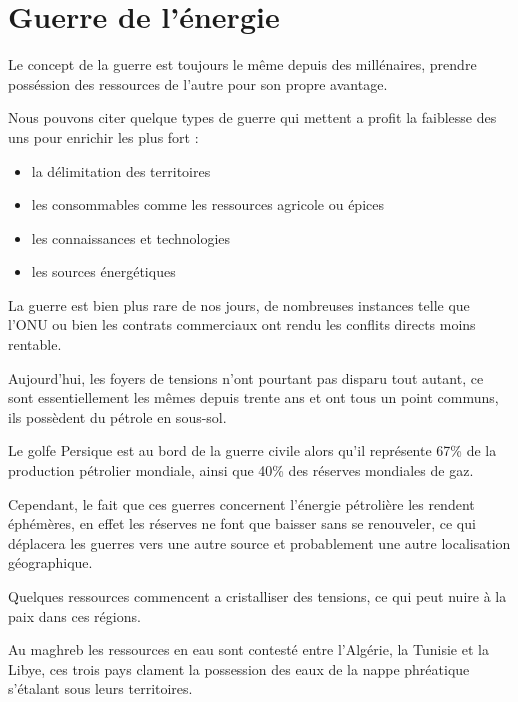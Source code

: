 \section{Guerre de l'énergie}

Le concept de la guerre est toujours le même depuis des millénaires, prendre posséssion des
ressources de l'autre pour son propre avantage.

Nous pouvons citer quelque types de guerre qui mettent a profit la faiblesse des uns
pour enrichir les plus fort :

\begin{itemize}
  \item la délimitation des territoires %
  \item les consommables comme les ressources agricole ou épices
  \item les connaissances et technologies
  \item les sources énergétiques
\end{itemize}

La guerre est bien plus rare de nos jours, de nombreuses instances telle que l'ONU ou bien les
contrats commerciaux ont rendu les conflits directs moins rentable.

Aujourd'hui, les foyers de tensions n’ont pourtant pas disparu tout autant,
ce sont essentiellement les mêmes depuis trente ans et ont tous un point communs,
ils possèdent du pétrole en sous-sol.

Le golfe Persique est au bord de la guerre civile alors qu'il représente 67\%
de la production pétrolier mondiale, ainsi que 40\% des réserves mondiales de gaz.

Cependant, le fait que ces guerres concernent l'énergie pétrolière les rendent éphémères,
en effet les réserves ne font que baisser sans se renouveler, ce qui déplacera les
guerres vers une autre source et probablement une autre localisation géographique.

Quelques ressources commencent a cristalliser des tensions, ce qui peut nuire à la paix
dans ces régions.

Au maghreb les ressources en eau sont contesté entre l'Algérie, la Tunisie et la Libye, ces
trois pays clament la possession des eaux de la nappe phréatique s'étalant sous leurs
territoires.

